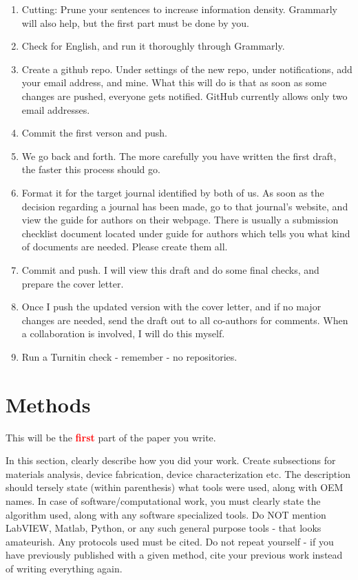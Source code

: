 \documentclass[12 pt]{article}
\begin{document}
\begin{enumerate}
\item Cutting: Prune your sentences to increase information density. Grammarly will also help, but the first part must be done by you.
\item Check for English\cite{burchfield:1998,strunk:2000}, and run it thoroughly through Grammarly.
\item Create a github repo. Under settings of the new repo, under notifications, add your email address, and mine. What this will do is that as soon as some changes are pushed, everyone gets notified. GitHub currently allows only two email addresses.
\item Commit the first verson and push.
\item We go back and forth. The more carefully you have written the first draft, the faster this process should go.
\item Format it for the target journal identified by both of us. As soon as the decision regarding a journal has been made, go to that journal's website, and view the guide for authors on their webpage. There is usually a submission checklist document located under guide for authors which tells you what kind of documents are needed. Please create them all.
\item Commit and push. I will view this draft and do some final checks, and prepare the cover letter.
\item Once I push the updated version with the cover letter, and if no major changes are needed, send the draft out to all co-authors for comments. When a collaboration is involved, I will do this myself.
\item Run a Turnitin check - remember - no repositories.
\end{enumerate}

\section{Methods}
This will be the \textbf{\Huge \textcolor{red}{first}} part of the paper you write.

In this section, clearly describe how you did your work. Create subsections for materials analysis, device fabrication, device characterization etc. The description should tersely state (within parenthesis) what tools were used, along with OEM names. In case of software/computational work, you must clearly state the algorithm used, along with any software specialized tools. Do NOT mention LabVIEW, Matlab, Python, or any such general purpose tools - that looks amateurish. Any protocols used must be cited. Do not repeat yourself - if you have previously published with a given method, cite your previous work instead of writing everything again.
\end{document}
